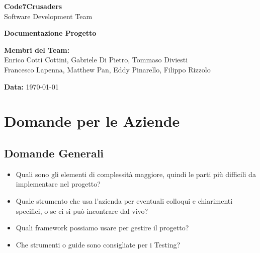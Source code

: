 \documentclass{article}
\begin{document}
\begin{titlepage}
    {\Huge \textbf{Code7Crusaders}}\\
    \vspace{0.5cm}
    {\Large Software Development Team}\\
    \vspace{2cm}
    
    {\large \textbf{Documentazione Progetto}}\\
    \vspace{5cm}

    \textbf{Membri del Team:}\\
    Enrico Cotti Cottini, Gabriele Di Pietro, Tommaso Diviesti \\
    Francesco Lapenna, Matthew Pan, Eddy Pinarello, Filippo Rizzolo \\
    \vspace{0.5cm}
    
    {\large \textbf{Data:}} \today\\
    
    \vspace{1cm}
\end{titlepage}

\newpage
\tableofcontents
\newpage

\section{Domande per le Aziende}\label{sec:domande-aziende}
\subsection{Domande Generali}\label{subsec:domande-generali}
\begin{itemize}
    \item Quali sono gli elementi di complessità maggiore, quindi le parti più difficili da implementare nel progetto?
    \item Quale strumento che usa l’azienda per eventuali colloqui e chiarimenti specifici, o se ci si può incontrare dal vivo?
    \item Quali framework possiamo usare per gestire il progetto? 
    \item Che strumenti o guide sono consigliate per i Testing?
\end{itemize}
\end{document}
